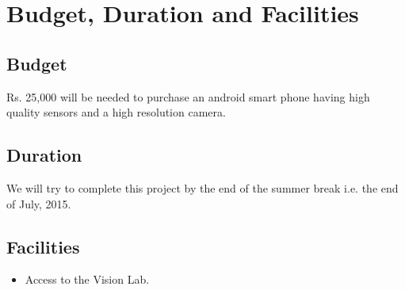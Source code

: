 \documentclass{article}
\begin{document}
	\section{Budget, Duration and Facilities}	
		\subsection{Budget}
			Rs. 25,000 will be needed to purchase an android smart phone having high quality sensors and a high resolution camera.
		\subsection{Duration}
			We will try to complete this project by the end of the summer break i.e. the end of July, 2015. 
		\subsection{Facilities}
		    \begin{itemize}
		    \item Access to the Vision Lab.
		    \end{itemize}
\end{document}
